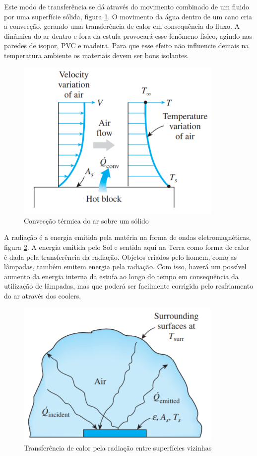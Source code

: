 
Este modo de transferência se dá através do movimento combinado de um fluido por uma superfície sólida, figura \ref{fig:conveccao_termica}. O movimento da água dentro de um cano cria a convecção, gerando uma transferência de calor em consequência do fluxo. A dinâmica do ar dentro e fora da estufa provocará esse fenômeno físico, agindo nas paredes de isopor, PVC e madeira. Para que esse efeito não influencie demais na temperatura ambiente os materiais devem ser bons isolantes.
\begin{figure}[H]
	\centering
	\includegraphics[width=10cm]{figuras/conveccao_termica.png}
	\caption{Convecção térmica do ar sobre um sólido}
	\label{fig:conveccao_termica}
\end{figure}


A radiação é a energia emitida pela matéria na forma de ondas eletromagnéticas, figura \ref{fig:radiacao_termica}. A energia emitida pelo Sol e sentida aqui na Terra como forma de calor é dada pela transferência da radiação. Objetos criados pelo homem, como as lâmpadas, também emitem energia pela radiação. Com isso, haverá um possível aumento da energia interna da estufa ao longo do tempo em consequência da utilização de lâmpadas, mas que poderá ser facilmente corrigida pelo resfriamento do ar através dos coolers.
\begin{figure}[H]
	\centering
	\includegraphics[width=10cm]{figuras/radiacao_termica.png}
	\caption{Transferência de calor pela radiação entre superfícies vizinhas }
	\label{fig:radiacao_termica}
\end{figure}